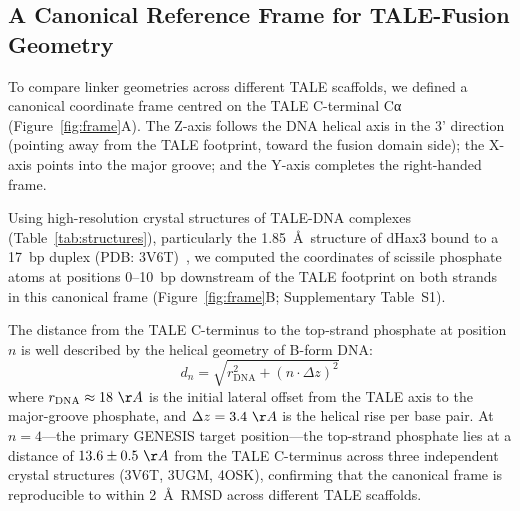 \documentclass[11pt,a4paper]{article}
\newcommand{\angstrom}{\AA}
\begin{document}
\subsection{A Canonical Reference Frame for TALE-Fusion Geometry}
\label{subsec:frame}

To compare linker geometries across different TALE scaffolds, we defined a canonical
coordinate frame centred on the TALE C-terminal Cα (Figure~\ref{fig:frame}A).
The Z-axis follows the DNA helical axis in the 3' direction (pointing away from
the TALE footprint, toward the fusion domain side); the X-axis points into the
major groove; and the Y-axis completes the right-handed frame.

Using high-resolution crystal structures of TALE-DNA complexes (Table~\ref{tab:structures}),
particularly the 1.85~\angstrom\ structure of dHax3 bound to a 17~bp duplex
(PDB: 3V6T)~\citep{Mak2012}, we computed the coordinates of scissile phosphate
atoms at positions 0--10~bp downstream of the TALE footprint on both strands in
this canonical frame (Figure~\ref{fig:frame}B; Supplementary Table~S1).

The distance from the TALE C-terminus to the top-strand phosphate at position
$n$ is well described by the helical geometry of B-form DNA:
\begin{equation}
  d_n = \sqrt{r_\mathrm{DNA}^2 + (n \cdot \Delta z)^2}
  \label{eq:distance}
\end{equation}
where $r_\mathrm{DNA} \approx 18~\angstrom$ is the initial lateral offset from
the TALE axis to the major-groove phosphate, and $\Delta z = 3.4~\angstrom$ is
the helical rise per base pair. At $n = 4$---the primary GENESIS target position---the
top-strand phosphate lies at a distance of $13.6 \pm 0.5~\angstrom$ from the
TALE C-terminus across three independent crystal structures (3V6T, 3UGM, 4OSK),
confirming that the canonical frame is reproducible to within 2~\angstrom\ RMSD
across different TALE scaffolds.
\end{document}
